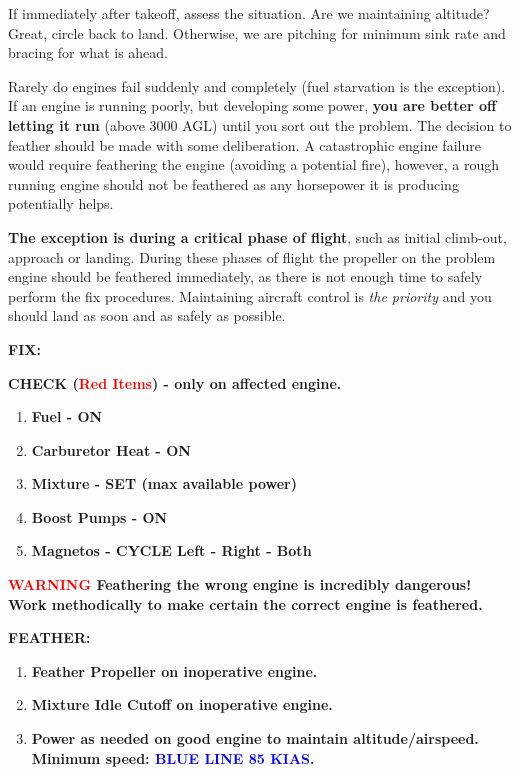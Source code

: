 If immediately after takeoff, assess the situation. Are we maintaining altitude? Great, circle back to land.
Otherwise, we are pitching for minimum sink rate and bracing for what is ahead.

Rarely do engines fail suddenly and completely (fuel starvation is the exception). If an engine is running poorly, but
developing some power, \textbf{you are better off letting it run} (above 3000 AGL) until you sort out the problem. The
decision to feather should be made with some deliberation. A catastrophic engine failure would require feathering
the engine (avoiding a potential fire), however, a rough running engine should not be feathered as any horsepower it
is producing potentially helps.

\textbf{The exception is during a critical phase of flight}, such as initial climb-out,
approach or landing. During these phases of flight the propeller on the problem engine should be feathered
immediately, as there is not enough time to safely perform the fix procedures. Maintaining aircraft control is
\emph{the priority} and you should land as soon and as safely as possible.

\textbf{FIX:}

\textbf{CHECK (\textcolor{red}{Red Items}) - only on affected engine.}
\begin{enumerate}
    \item \textbf{Fuel - ON}
    \item \textbf{Carburetor Heat - ON}
    \item \textbf{Mixture - SET (max available power)}
    \item \textbf{Boost Pumps - ON}
    \item \textbf{Magnetos - CYCLE Left - Right - Both}
\end{enumerate}

\textbf{\textcolor{red}{WARNING} Feathering the wrong engine is incredibly dangerous!
Work methodically to make certain the correct engine is feathered.}

\textbf{FEATHER:}
\begin{enumerate}
    \item \textbf{Feather Propeller on inoperative engine.}
    \item \textbf{Mixture Idle Cutoff on inoperative engine.}
    \item \textbf{Power as needed on good engine to maintain altitude/airspeed.\\Minimum speed: \textcolor{blue}{BLUE LINE 85 KIAS}.}
\end{enumerate}

